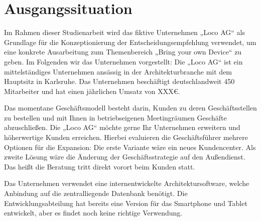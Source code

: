 \chapter{Ausgangssituation}
\label{cha:Ausgangssituation}
Im Rahmen dieser Studienarbeit wird das fiktive Unternehmen „Loco AG“ als Grundlage für die Konzeptionierung der Entscheidungsempfehlung verwendet, um eine konkrete Ausarbeitung zum Themenbereich „Bring your own Device“ zu geben. Im Folgenden wir das Unternehmen vorgestellt:
Die „Loco AG“ ist ein mittelständiges Unternehmen ansässig in der Architekturbranche mit dem Hauptsitz in Karlsruhe. Das Unternehmen beschäftigt deutschlandweit 450 Mitarbeiter und hat einen jährlichen Umsatz von XXX€.

Das momentane Geschäftsmodell besteht darin, Kunden zu deren Geschäftsstellen zu bestellen und mit Ihnen in betriebseigenen Meetingräumen Geschäfte abzuschließen. Die „Loco AG“ möchte gerne Ihr Unternehmen erweitern und höherwertige Kunden erreichen. Hierbei evaluieren die Geschäftsführer mehrere Optionen für die Expansion: Die erste Variante wäre ein neues  Kundencenter. Als zweite Lösung wäre die Änderung der Geschäftsstrategie auf den Außendienst. Das heißt die Beratung tritt direkt vorort beim Kunden statt. 

Das Unternehmen verwendet eine internentwickelte Architektursoftware, welche Anbindung auf die zentralliegende Datenbank benötigt. Die Entwicklungsabteilung hat bereits eine Version für das Smartphone und Tablet entwickelt, aber es findet noch keine richtige Verwendung.

 




